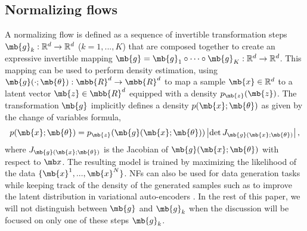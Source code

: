 \subsection{Normalizing flows}
A normalizing flow is defined as a sequence of invertible transformation steps $\mb{g}_k : \mathbb{R}^d \to \mathbb{R}^d$  ($k=1, ..., K$) that are composed together to create an expressive invertible mapping $\mb{g} = \mb{g}_1 \circ \dots \circ \mb{g}_K : \mathbb{R}^d \to \mathbb{R}^d$. %
This mapping can be used to perform density estimation, using $\mb{g}(\cdot ;\mb{\theta}): \mbb{R}^d \rightarrow \mbb{R}^d$ to map a sample $\mb{x} \in \mathbb{R}^d$ to a latent vector $\mb{z} \in \mbb{R}^d$ equipped with a density $p_{\mb{z}}(\mb{z})$.
The transformation $\mb{g}$ implicitly defines a density $p(\mb{x}; \mb{\theta})$ as given by the change of variables formula,
\begin{equation*}
    p(\mb{x}; \mb{\theta}) = p_{\mb{z}}(\mb{g}(\mb{x};\mb{\theta})) \left| \det  J_{\mb{g}(\mb{x};\mb{\theta})} \right|, \label{eq:NF_DE}
\end{equation*}
where $J_{\mb{g}(\mb{x};\mb{\theta})}$ is the Jacobian of $\mb{g}(\mb{x};\mb{\theta})$ with respect to $\mb x$.
The resulting model is trained by maximizing the likelihood of the data $\{\mb{x}^1, ..., \mb{x}^N\}$. NFs can also be used for data generation tasks while keeping track of the density of the generated samples such as to improve the latent distribution in variational auto-encoders \citep{NF}.
In the rest of this paper, we will not distinguish between $\mb{g}$ and $\mb{g}_k$ when the discussion will be focused on only one of these steps $\mb{g}_k$.

